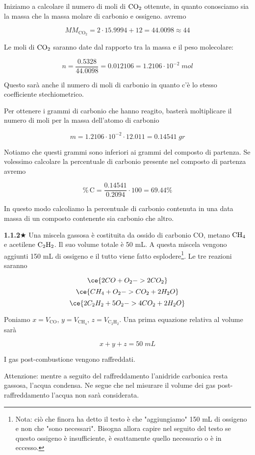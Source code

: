 Iniziamo a calcolare il numero di moli di $\rm CO_2$ ottenute, in quanto conosciamo sia la massa che la massa molare di carbonio e ossigeno. avremo

$$MM_{\text{CO}_2}=2 \cdot 15.9994 + 12 = 44.0098 \approx 44$$

Le moli di $\rm CO_2$ saranno date dal rapporto tra la massa e il peso molecolare:

$$n=\frac{0.5328}{44.0098}=0.012106=1.2106 \cdot 10^{-2} \; mol$$

Questo sarà anche il numero di moli di carbonio in quanto c'è lo stesso coefficiente stechiometrico.

Per ottenere i grammi di carbonio che hanno reagito, basterà moltiplicare il numero di moli per la massa dell'atomo di carbonio

$$m=1.2106 \cdot 10^{-2} \cdot 12.011=0.14541 \; gr$$

Notiamo che questi grammi sono inferiori ai grammi del composto di partenza. Se volessimo calcolare la percentuale di carbonio presente nel composto di partenza avremo

$$\%\,\text{C}=\frac{0.14541}{0.2094}\cdot 100 = 69.44 \%$$

In questo modo calcoliamo la percentuale di carbonio contenuta in una data massa di un composto contenente sia carbonio che altro.

\vspace{0.2cm}\textbf{1.1.2}$\bigstar$ Una miscela gassosa è costituita da ossido di carbonio CO, metano $\rm CH_4$ e acetilene $\rm C_2H_2$. Il suo volume totale è 50 mL. A questa miscela vengono aggiunti 150 mL di ossigeno e il tutto viene fatto esplodere\footnote{Nota: ciò che finora ha detto il testo è che "aggiungiamo" 150 mL di ossigeno e non che "sono necessari". Bisogna allora capire nel seguito del testo se questo ossigeno è insufficiente, è esattamente quello necessario o è in eccesso.}. Le tre reazioni saranno

$$\ce{2CO + O_2 -> 2CO_2}$$
$$\ce{CH_4 + O_2 -> CO_2 + 2H_2O}$$
$$\ce{2C_2H_2 + 5O_2 -> 4CO_2 + 2H_2O}$$

Poniamo $x=V_{\text{CO}}$, $y=V_{\text{CH}_4}$, $z=V_{\text{C}_2\text{H}_2}$. Una prima equazione relativa al volume sarà

$$x+y+z=50 \; mL$$

I gas post-combustione vengono raffreddati.

Attenzione: mentre a seguito del raffreddamento l'anidride carbonica resta gassosa, l'acqua condensa. Ne segue che nel misurare il volume dei gas post-raffreddamento l'acqua non sarà considerata.

